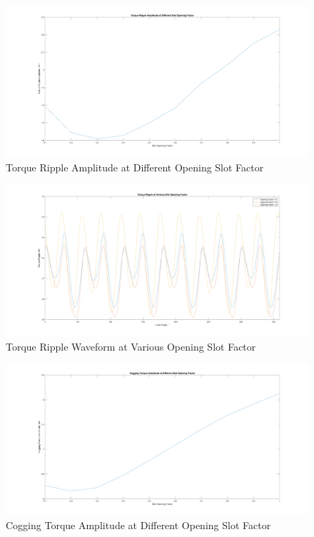 \documentclass[12pt]{article}
\begin{document}
\begin{figure}[H]
    \centering
    \includegraphics[width=\linewidth]{img/task_10_ripple_amplitude.png}
    \caption{Torque Ripple Amplitude at Different Opening Slot Factor}
    \label{fig:task-10-ripple-amp}
\end{figure}

\begin{figure}[H]
    \centering
    \includegraphics[width=\linewidth]{img/task_10_torque_ripple.png}
    \caption{Torque Ripple Waveform at Various Opening Slot Factor}
    \label{fig:task-10-ripple}
\end{figure}

\begin{figure}[H]
    \centering
    \includegraphics[width=\linewidth]{img/task_10_cogging_amplitude.png}
    \caption{Cogging Torque Amplitude at Different Opening Slot Factor}
    \label{fig:task-10-cogging-amp}
\end{figure}
\end{document}
